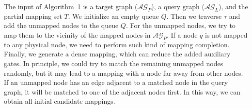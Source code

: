 \documentclass[journal]{IEEEtran}
\begin{document}
	The input of Algorithm~1 %
	is a target graph ($\mathcal{AG}_{P}$), a query graph ($\mathcal{AG}_{L}$), and the partial mapping set $T$. We initialize an empty queue $Q$.
	Then we traverse $\tau$ and add the unmapped nodes to the queue $Q$. For the unmapped nodes, we try to map them to the vicinity of the mapped nodes in $\mathcal{AG}_{P}$. If a node $\textit{q}$ is not mapped to any physical node, we need to perform such kind of mapping completion. Finally, we generate a dense mapping, which can reduce the added auxiliary gates. In principle, we could try to match the remaining unmapped nodes randomly, but it may lead to a mapping with a node far away from other nodes. If an unmapped node has an edge adjacent to a matched node in the query graph, it will be matched to one of the adjacent nodes first.  In this way, we can obtain all initial candidate mappings.
	
\end{document}
